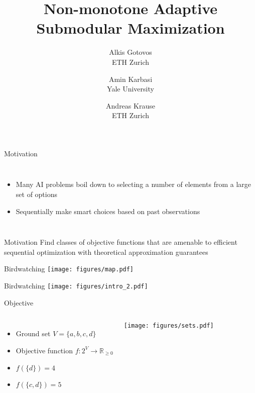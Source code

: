 \documentclass[xetex,10pt,mathserif]{beamer}
\title[Non-monotone Adaptive Submodular Maximization]
{Non-monotone Adaptive Submodular Maximization}
\author[Alkis Gotovos]{
\vspace{1in}
\normalsize
\parbox{1in}{Alkis Gotovos\\{\footnotesize ETH Zurich}}\and
\parbox{1in}{Amin Karbasi\\{\footnotesize Yale University}}\and
\parbox{1in}{Andreas Krause\\{\footnotesize ETH Zurich}}
}
\date[May 4, 2015]{
\begin{center}
{\normalsize
ICML '15
}
\end{center}
}
\begin{document}


\begin{frame}{Motivation}
\begin{columns}[c]
\begin{itemize}
\item<1-> Many AI problems boil down to selecting a number of elements from a large set of options
\vspace{3em}
\item<2-> Sequentially make smart choices based on past observations
\end{itemize}
\end{columns}
\end{frame}

\begin{frame}{Motivation}
\large{Find classes of objective functions that are amenable to efficient sequential optimization with theoretical approximation guarantees}
\end{frame}

\begin{frame}{Birdwatching}
\centering
\texttt{[image: figures/map.pdf]}
\end{frame}

\begin{frame}{Birdwatching}
\centering
\texttt{[image: figures/intro\_2.pdf]}
\end{frame}

\begin{frame}{Objective}
\begin{columns}[c]
\begin{itemize}
\item<2-> Ground set $V = \{a, b, c, d\}$
\vspace{2em}
\item<3-> Objective function $f : 2^V \to \mathbb{R}_{\geq 0}$
\vspace{2em}
\item<4-> $f(\{d\}) = 4$
\vspace{2em}
\item<5-> $f(\{c, d\}) = 5$
\end{itemize}
\centering
\texttt{[image: figures/sets.pdf]}
\end{columns}
\end{frame}
\end{document}

